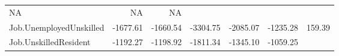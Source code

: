 \documentclass[]{article}
\begin{document}
\begin{longtable}[]{@{}lrrrrrr@{}}
\begin{minipage}[t]{0.08\columnwidth}
NA\strut
\end{minipage} & \begin{minipage}[t]{0.08\columnwidth}\raggedleft\strut
NA\strut
\end{minipage} & \begin{minipage}[t]{0.08\columnwidth}\raggedleft\strut
NA\strut
\end{minipage}\tabularnewline
\begin{minipage}[t]{0.31\columnwidth}\raggedright\strut
Job.UnemployedUnskilled\strut
\end{minipage} & \begin{minipage}[t]{0.10\columnwidth}\raggedleft\strut
-1677.61\strut
\end{minipage} & \begin{minipage}[t]{0.08\columnwidth}\raggedleft\strut
-1660.54\strut
\end{minipage} & \begin{minipage}[t]{0.08\columnwidth}\raggedleft\strut
-3304.75\strut
\end{minipage} & \begin{minipage}[t]{0.08\columnwidth}\raggedleft\strut
-2085.07\strut
\end{minipage} & \begin{minipage}[t]{0.08\columnwidth}\raggedleft\strut
-1235.28\strut
\end{minipage} & \begin{minipage}[t]{0.08\columnwidth}\raggedleft\strut
159.39\strut
\end{minipage}\tabularnewline
\begin{minipage}[t]{0.31\columnwidth}\raggedright\strut
Job.UnskilledResident\strut
\end{minipage} & \begin{minipage}[t]{0.10\columnwidth}\raggedleft\strut
-1192.27\strut
\end{minipage} & \begin{minipage}[t]{0.08\columnwidth}\raggedleft\strut
-1198.92\strut
\end{minipage} & \begin{minipage}[t]{0.08\columnwidth}\raggedleft\strut
-1811.34\strut
\end{minipage} & \begin{minipage}[t]{0.08\columnwidth}\raggedleft\strut
-1345.10\strut
\end{minipage} & \begin{minipage}[t]{0.08\columnwidth}\raggedleft\strut
-1059.25\strut
\end{minipage} & \begin{minipage}[t]{0.08\columnwidth}\raggedleft\strut

\end{minipage}
\end{longtable}
\end{document}
